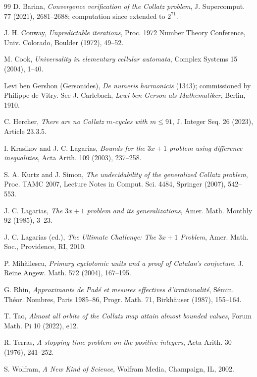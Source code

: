 \documentclass[11pt]{article}
\theoremstyle{definition}
\theoremstyle{remark}
\begin{document}
\begin{thebibliography}{99}
D. Barina,
\emph{Convergence verification of the Collatz problem},
J. Supercomput. 77 (2021), 2681--2688; computation since extended to
$2^{71}$.

J. H. Conway,
\emph{Unpredictable iterations},
Proc. 1972 Number Theory Conference, Univ. Colorado, Boulder (1972),
49--52.

M. Cook,
\emph{Universality in elementary cellular automata},
Complex Systems 15 (2004), 1--40.

Levi ben Gershon (Gersonides),
\emph{De numeris harmonicis} (1343); commissioned by Philippe de Vitry.
See J. Carlebach, \emph{Lewi ben Gerson als Mathematiker}, Berlin, 1910.

C. Hercher,
\emph{There are no Collatz $m$-cycles with $m \leq 91$},
J. Integer Seq. 26 (2023), Article 23.3.5.

I. Krasikov and J. C. Lagarias,
\emph{Bounds for the $3x+1$ problem using difference inequalities},
Acta Arith. 109 (2003), 237--258.

S. A. Kurtz and J. Simon,
\emph{The undecidability of the generalized Collatz problem},
Proc. TAMC 2007, Lecture Notes in Comput. Sci. 4484, Springer (2007),
542--553.

J. C. Lagarias,
\emph{The $3x+1$ problem and its generalizations},
Amer. Math. Monthly 92 (1985), 3--23.

J. C. Lagarias (ed.),
\emph{The Ultimate Challenge: The $3x+1$ Problem},
Amer. Math. Soc., Providence, RI, 2010.

P. Mih\u{a}ilescu,
\emph{Primary cyclotomic units and a proof of Catalan's conjecture},
J. Reine Angew. Math. 572 (2004), 167--195.

G. Rhin,
\emph{Approximants de Pad\'e et mesures effectives d'irrationalit\'e},
S\'emin. Th\'eor. Nombres, Paris 1985--86, Progr. Math. 71, Birkh\"auser
(1987), 155--164.

T. Tao,
\emph{Almost all orbits of the Collatz map attain almost bounded values},
Forum Math. Pi 10 (2022), e12.

R. Terras,
\emph{A stopping time problem on the positive integers},
Acta Arith. 30 (1976), 241--252.

S. Wolfram,
\emph{A New Kind of Science},
Wolfram Media, Champaign, IL, 2002.

\end{thebibliography}
\end{document}
